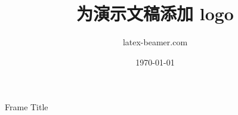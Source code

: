 \documentclass{ctexbeamer}
\title{为演示文稿添加 logo}
\author{latex-beamer.com}
\date{\today}
\begin{document}
\begin{frame}
  \titlepage 
\end{frame}

\begin{frame}{Frame Title}
\end{frame}
\end{document}
